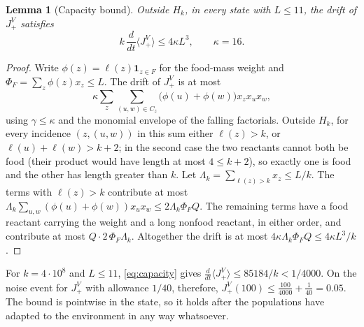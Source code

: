 \documentclass[11pt,letterpaper]{article}
\theoremstyle{plain}
\newtheorem{lemma}[theorem]{Lemma}
\theoremstyle{definition}
\theoremstyle{remark}
\numberwithin{equation}{section}
\newcommand{\ind}{\mathbf 1}
\begin{document}
\begin{lemma}[Capacity bound]\label{lem:capacity}
Outside $H_k$, in every state with $L\le11$, the drift of $J^V_+$ satisfies
\begin{equation}\label{eq:capacity}
 k\,\frac{d}{dt}\langle J^V_+\rangle\le4\kappa L^3,\qquad\kappa=16 .
\end{equation}
\end{lemma}
\begin{proof}
Write $\phi(z)=\ell(z)\ind_{z\in F}$ for the food-mass weight and $\Phi_F=\sum_z\phi(z)x_z\le L$. The drift of $J^V_+$ is at most
\[
 \kappa\sum_z\sum_{(u,w)\in C_z}\bigl(\phi(u)+\phi(w)\bigr)x_zx_ux_w ,
\]
using $\gamma\le\kappa$ and the monomial envelope of the falling factorials. Outside $H_k$, for every incidence $(z,(u,w))$ in this sum either $\ell(z)>k$, or $\ell(u)+\ell(w)>k+2$; in the second case the two reactants cannot both be food (their product would have length at most $4\le k+2$), so exactly one is food and the other has length greater than $k$. Let $\Lambda_k=\sum_{\ell(z)>k}x_z\le L/k$. The terms with $\ell(z)>k$ contribute at most $\Lambda_k\sum_{u,w}(\phi(u)+\phi(w))x_ux_w\le2\Lambda_k\Phi_FQ$. The remaining terms have a food reactant carrying the weight and a long nonfood reactant, in either order, and contribute at most $Q\cdot2\,\Phi_F\Lambda_k$. Altogether the drift is at most $4\kappa\Lambda_k\Phi_FQ\le4\kappa L^3/k$.
\end{proof}
For $k=4\cdot10^8$ and $L\le11$, \eqref{eq:capacity} gives $\frac{d}{dt}\langle J^V_+\rangle\le85184/k<1/4000$. On the noise event for $J^V_+$ with allowance $1/40$, therefore, $J^V_+(100)\le\frac{100}{4000}+\frac1{40}=0.05$. The bound is pointwise in the state, so it holds after the populations have adapted to the environment in any way whatsoever.
\end{document}
